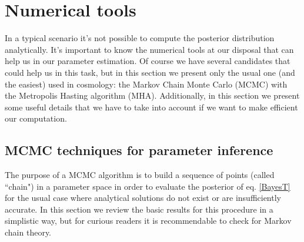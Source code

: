 \documentclass[onecolumn,           %
               showpacs,            %
               preprintnumbers,     %
               aps,                 %
               prl,          	    %
               letterpaper,             %
               superscriptaddress,      %
               nofootinbib,         %
               tightenlines,        %
               floats,floatfix      %
               ,usenatbib,
               ]{revtex4-1}
\begin{document}

%

\section{Numerical tools}

In a typical scenario it's not possible to compute the posterior distribution analytically. It's important to know the numerical tools at our disposal that can help us in our parameter estimation. Of course we have several candidates that could help us in this task, but in this section we present only the usual one (and the easiest) used in cosmology: the Markov Chain Monte Carlo (MCMC) with the Metropolis Hasting algorithm (MHA). Additionally, in this section we present some useful details that we have to take into account if we want to make efficient our computation. 

\subsection{MCMC techniques for parameter inference}

The purpose of a MCMC algorithm is to build a sequence of points (called ``chain") in a parameter space in order to evaluate the posterior of eq. \eqref{BayesT} for the usual case where analytical solutions do not exist or are insufficiently accurate. In this section we review the basic results for this procedure in a simplistic way, but for curious readers it is recommendable to check \cite{mcmc1, mcmc2, mcmc3, mcmc4} for Markov chain theory.
\end{document}
